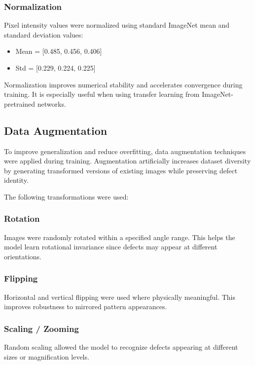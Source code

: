 \subsubsection {Normalization}

Pixel intensity values were normalized using standard ImageNet mean and standard deviation values:
\begin{itemize}
\item Mean = [0.485, 0.456, 0.406]
\item Std = [0.229, 0.224, 0.225]
\end{itemize}
Normalization improves numerical stability and accelerates convergence during training. It is especially useful when using transfer learning from ImageNet-pretrained networks.

\subsection{Data Augmentation}

To improve generalization and reduce overfitting, data augmentation techniques were applied during training. Augmentation artificially increases dataset diversity by generating transformed versions of existing images while preserving defect identity.

The following transformations were used:

 \subsubsection{Rotation}

Images were randomly rotated within a specified angle range. This helps the model learn rotational invariance since defects may appear at different orientations.

 \subsubsection{Flipping}

Horizontal and vertical flipping were used where physically meaningful. This improves robustness to mirrored pattern appearances.

 \subsubsection{Scaling / Zooming}

Random scaling allowed the model to recognize defects appearing at different sizes or magnification levels.

